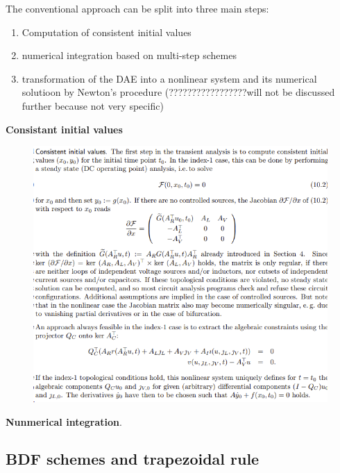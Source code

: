 The conventional approach can be split into three main steps:
\begin{enumerate}
	\item Computation of consistent initial values
	\item numerical integration based on multi-step schemes
	\item transformation of the DAE into a nonlinear system and its numerical solutioon by Newton's procedure (?????????????????will not be discussed further because not very specific)
\end{enumerate}

\textbf{Consistant initial values} 
\begin{figure}[H]
	\centering
	\includegraphics[width=0.7\linewidth]{screenshot009}
	\caption{}
	\label{fig:screenshot009}
\end{figure}

\textbf{Nunmerical integration}.


\subsection{BDF schemes and trapezoidal rule}